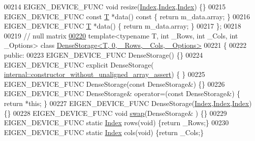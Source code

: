 \begin{DoxyCode}
00214     EIGEN\_DEVICE\_FUNC \textcolor{keywordtype}{void} resize(\hyperlink{namespace_eigen_a62e77e0933482dafde8fe197d9a2cfde}{Index},\hyperlink{namespace_eigen_a62e77e0933482dafde8fe197d9a2cfde}{Index},\hyperlink{namespace_eigen_a62e77e0933482dafde8fe197d9a2cfde}{Index}) \{\}
00215     EIGEN\_DEVICE\_FUNC \textcolor{keyword}{const} \hyperlink{group___sparse_core___module}{T} *data()\textcolor{keyword}{ const }\{ \textcolor{keywordflow}{return} m\_data.array; \}
00216     EIGEN\_DEVICE\_FUNC \hyperlink{group___sparse_core___module}{T} *data() \{ \textcolor{keywordflow}{return} m\_data.array; \}
00217 \};
00218 
00219 \textcolor{comment}{// null matrix}
\hyperlink{class_eigen_1_1_dense_storage_3_01_t_00_010_00_01___rows_00_01___cols_00_01___options_01_4}{00220} \textcolor{keyword}{template}<\textcolor{keyword}{typename} T, \textcolor{keywordtype}{int} \_Rows, \textcolor{keywordtype}{int} \_Cols, \textcolor{keywordtype}{int} \_Options> \textcolor{keyword}{class }
      \hyperlink{class_eigen_1_1_dense_storage_3_01_t_00_010_00_01___rows_00_01___cols_00_01___options_01_4}{DenseStorage<T, 0, \_Rows, \_Cols, \_Options>}
00221 \{
00222   \textcolor{keyword}{public}:
00223     EIGEN\_DEVICE\_FUNC DenseStorage() \{\}
00224     EIGEN\_DEVICE\_FUNC \textcolor{keyword}{explicit} DenseStorage(
      \hyperlink{struct_eigen_1_1internal_1_1constructor__without__unaligned__array__assert}{internal::constructor\_without\_unaligned\_array\_assert}) \{
      \}
00225     EIGEN\_DEVICE\_FUNC DenseStorage(\textcolor{keyword}{const} DenseStorage&) \{\}
00226     EIGEN\_DEVICE\_FUNC DenseStorage& operator=(\textcolor{keyword}{const} DenseStorage&) \{ \textcolor{keywordflow}{return} *\textcolor{keyword}{this}; \}
00227     EIGEN\_DEVICE\_FUNC DenseStorage(\hyperlink{namespace_eigen_a62e77e0933482dafde8fe197d9a2cfde}{Index},\hyperlink{namespace_eigen_a62e77e0933482dafde8fe197d9a2cfde}{Index},\hyperlink{namespace_eigen_a62e77e0933482dafde8fe197d9a2cfde}{Index}) \{\}
00228     EIGEN\_DEVICE\_FUNC \textcolor{keywordtype}{void} \hyperlink{endian_8c_a3ca5ecd34b04d6a243c054ac3a57f68d}{swap}(DenseStorage& ) \{\}
00229     EIGEN\_DEVICE\_FUNC \textcolor{keyword}{static} \hyperlink{namespace_eigen_a62e77e0933482dafde8fe197d9a2cfde}{Index} rows(\textcolor{keywordtype}{void}) \{\textcolor{keywordflow}{return} \_Rows;\}
00230     EIGEN\_DEVICE\_FUNC \textcolor{keyword}{static} \hyperlink{namespace_eigen_a62e77e0933482dafde8fe197d9a2cfde}{Index} cols(\textcolor{keywordtype}{void}) \{\textcolor{keywordflow}{return} \_Cols;\}

\end{DoxyCode}
